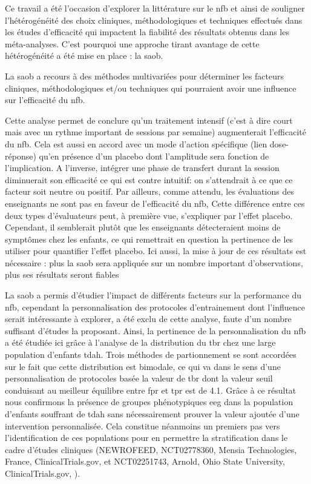 Ce travail a été l'occasion d'explorer 
la littérature sur le \gls{nfb} et ainsi de souligner l'hétérogénéité des choix cliniques, méthodologiques et techniques effectués dans les études d'efficacité qui impactent la fiabilité
des résultats obtenus dans les méta-analyses. C'est pourquoi une approche tirant avantage de cette hétérogénéité a été mise en place : la \gls{saob}.

La \gls{saob} a recours à des méthodes multivariées pour déterminer les facteurs cliniques, méthodologiques et/ou techniques qui pourraient avoir une influence sur l'efficacité du \gls{nfb}. 

Cette analyse permet de conclure qu'un traitement intensif (c'est à dire court mais avec un rythme important de sessions par semaine) augmenterait 
l'efficacité du \gls{nfb}. Cela est aussi en accord avec un mode d'action spécifique (lien dose-réponse) qu'en présence d'un placebo dont l'amplitude sera fonction de l'implication. A l'inverse,  
intégrer une phase de transfert durant la session diminuerait son efficacité ce qui est contre intuitif: on s'attendrait à ce que ce facteur 
soit neutre ou positif. Par ailleurs, comme attendu, les évaluations des enseignants ne sont pas en faveur de l'efficacité du \gls{nfb},
Cette différence entre ces deux types d'évaluateurs peut, à première vue, s'expliquer par l'effet placebo. Cependant, il semblerait plutôt que les enseignants détecteraient moins de symptômes chez les enfants, ce qui remettrait en question la
pertinence de les utiliser pour quantifier l'effet placebo. Ici aussi, la mise à jour de ces résultats est nécessaire : plus la \gls{saob} sera appliquée sur un nombre important d'observations,
plus ses résultats seront fiables

La \gls{saob} a permis d'étudier l'impact de différents facteurs sur la performance du \gls{nfb}, cependant la personnalisation des protocoles d'entrainement dont l'influence serait intéressante 
à explorer, a été exclu de cette analyse, faute d'un nombre suffisant d'études la proposant. Ainsi, la pertinence de la personnalisation du \gls{nfb} a été étudiée ici grâce à l'analyse de la distribution 
du \gls{tbr} chez une large population d'enfants \gls{tdah}. Trois méthodes de partionnement se sont accordées sur le fait que cette distribution est bimodale, ce qui va dans 
le sens d'une personnalisation de protocoles basée la valeur de \gls{tbr} dont la valeur seuil conduisant au meilleur équilibre entre \gls{fpr} et \gls{tpr} est de 4.1. 
Grâce à ce résultat nous confirmons la présence de 
groupes phénotypiques \gls{eeg} dans la population d'enfants souffrant de \gls{tdah} sans nécessairement prouver la valeur ajoutée d'une 
intervention personnalisée. Cela constitue néanmoins un premiers pas vers l'identification de ces populations pour en 
permettre la stratification dans le cadre d'études cliniques (NEWROFEED, NCT02778360, Mensia Technologies, France, ClinicalTrials.gov, \citet{Bioulac2019} et NCT02251743, Arnold, Ohio State University, 
ClinicalTrials.gov, \citet{Kerson2013}).

